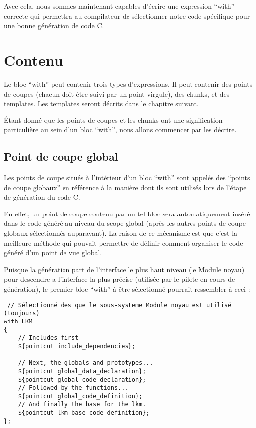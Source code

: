 \documentclass[french]{rtxreport}
\begin{document}
Avec cela, nous sommes maintenant capables d'écrire une expression “with”
correcte qui permettra au compilateur de sélectionner notre code spécifique
pour une bonne génération de code C.

\section{Contenu}

Le bloc ``with'' peut contenir trois types d'expressions. Il peut contenir des
points de coupes (chacun doit être suivi par un point-virgule), des chunks, et
des templates. Les templates seront décrits dans le chapitre suivant.

Étant donné que les points de coupes et les chunks ont une signification
particulière au sein d'un bloc ``with'', nous allons commencer par les décrire.

\subsection{Point de coupe global}

Les points de coupe situés à l'intérieur d'un bloc ``with'' sont appelés des
``points de coupe globaux'' en référence à la manière dont ils sont utilisés
lors de l'étape de génération du code C.

En effet, un point de coupe contenu par un tel bloc sera automatiquement inséré
dans le code généré au niveau du scope global (après les autres points de coupe
globaux sélectionnés auparavant). La raison de ce mécanisme est que c'est la
meilleure méthode qui pouvait permettre de définir comment organiser le code
généré d'un point de vue global.

Puisque la génération part de l'interface le plus haut niveau (le Module
noyau) pour descendre a l'interface la plus précise (utilisée par le pilote en
cours de génération), le premier bloc ``with'' à être sélectionné pourrait
ressembler à ceci :

\begin{lstlisting}
 // Sélectionné des que le sous-systeme Module noyau est utilisé (toujours)
with LKM
{
    // Includes first
    ${pointcut include_dependencies};

    // Next, the globals and prototypes...
    ${pointcut global_data_declaration};
    ${pointcut global_code_declaration};
    // Followed by the functions...
    ${pointcut global_code_definition};
    // And finally the base for the lkm.
    ${pointcut lkm_base_code_definition};
};
\end{lstlisting}
\end{document}
